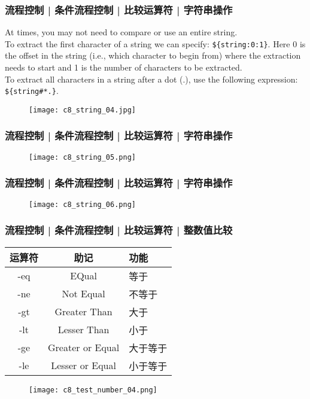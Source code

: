 \begin{frame}[fragile]
  \frametitle{流程控制 | 条件流程控制 | 比较运算符 | 字符串操作}
  At times, you may not need to compare or use an entire string.\\
  \vspace{0.2cm}
  To extract the first character of a string we can specify: \verb|${string:0:1}|. Here 0 is the offset in the string (i.e., which character to begin from) where the extraction needs to start and 1 is the number of characters to be extracted.\\
  \vspace{0.2cm}
  To extract all characters in a string after a dot (.), use the following expression: \verb|${string#*.}|.
  \begin{figure}
    \centering
    \texttt{[image: c8\_string\_04.jpg]}
  \end{figure}
\end{frame}

\begin{frame}
  \frametitle{流程控制 | 条件流程控制 | 比较运算符 | 字符串操作}
  \begin{figure}
    \centering
    \texttt{[image: c8\_string\_05.png]}
  \end{figure}
\end{frame}

\begin{frame}
  \frametitle{流程控制 | 条件流程控制 | 比较运算符 | 字符串操作}
  \begin{figure}
    \centering
    \texttt{[image: c8\_string\_06.png]}
  \end{figure}
\end{frame}

\begin{frame}
  \frametitle{流程控制 | 条件流程控制 | 比较运算符 | \alert{整数值比较}}
  \begin{table}
    \centering
    \begin{tabularx}{0.7\textwidth}{ccX}
      \hline
      \rowcolor{blue!50}运算符 & 助记 & 功能\\
      \hline
      -eq & EQual & 等于\\
      -ne & Not Equal & 不等于\\
      -gt & Greater Than & 大于\\
      -lt & Lesser Than & 小于\\
      -ge & Greater or Equal & 大于等于\\
      -le & Lesser or Equal & 小于等于\\
      \hline
    \end{tabularx}
  \end{table}
  \begin{figure}
    \centering
    \texttt{[image: c8\_test\_number\_04.png]}
  \end{figure}
\end{frame}

